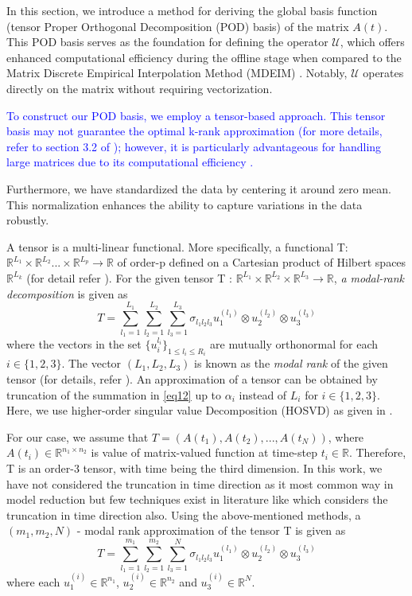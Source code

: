 \documentclass{article}
\begin{document}
In this section, we introduce a method for deriving the global basis function (tensor Proper Orthogonal Decomposition (POD) basis) of the matrix $A(t)$. This POD basis serves as the foundation for defining the operator $\mathcal{U}$, which offers enhanced computational efficiency during the offline stage when compared to the Matrix Discrete Empirical Interpolation Method (MDEIM) \cite{MDEIM}. Notably, $\mathcal{U}$ operates directly on the matrix without requiring vectorization.

\textcolor{blue}{To construct our POD basis, we employ a tensor-based approach. This tensor basis may not guarantee the optimal k-rank approximation (for more details, refer to section 3.2 of \cite{Kolda}); however, it is particularly advantageous for handling large matrices due to its computational efficiency \cite{ZHANG2005224}.}

Furthermore, we have standardized the data by centering it around zero mean. This normalization enhances the ability to capture variations in the data robustly.

 A tensor is a multi-linear functional. More specifically, a functional T: $\mathbb{R}^{L_1}\times \mathbb{R}^{L_2} . . .\times \mathbb{R}^{L_p}\rightarrow \mathbb{R}$ of order-p defined on a Cartesian product of Hilbert spaces $\mathbb{R}^{L_k}$ (for detail refer \cite{deLathauwer,Kolda,SDM}).
 For the given tensor T : $\mathbb{R}^{L_1}\times \mathbb{R}^{L_2} \times \mathbb{R}^{L_3}\rightarrow \mathbb{R}$, \emph{a modal-rank decomposition} is given as
 \begin{equation}\label{eq12} 
T=\sum_{l_1=1}^{L_1}\sum_{l_2=1}^{L_2}\sum_{l_3=1}^{L_3} \sigma_{l_1l_2l_3}u_1^{(l_1)} \otimes u_2^{(l_2)}\otimes  u_3^{(l_3)}
\end{equation}
where the vectors in the set $\{u_i^{l_i}\}_{1\leq l_i \leq R_i}$ are mutually orthonormal for each $i\in \{1,2,3\}$. The vector $(L_1,L_2,L_3)$ is known as the \emph{modal rank} of the given tensor (for details, refer \cite{deLathauwer}). An approximation of a tensor can be obtained by truncation of the summation in \eqref{eq12} up to $\alpha_i$ instead of $L_i$ for $i \in \{1,2,3\}$. Here, we use higher-order singular value Decomposition (HOSVD) as given in \cite{deLathauwer}.

For our case, we assume that $T= (A(t_1), A(t_2), ..., A(t_N))$, where $A(t_i) \in \mathbb{R}^{n_1 \times n_2}$ is value of matrix-valued function at  time-step $t_i\in \mathbb{R}$. Therefore, T is an order-3 tensor, with time being the third dimension.
In this work, we have not considered the truncation in time direction as it most common way in model reduction but few techniques exist in literature like \cite{CHOISpaceTime} which considers the truncation in time direction also. Using the above-mentioned methods, a $(m_1,m_2,N)$ - modal rank approximation of the tensor T is given as
\begin{equation*} 
T=\sum_{l_1=1}^{m_1}\sum_{l_2=1}^{m_2}\sum_{l_3=1}^{N} \sigma_{l_1l_2l_3}u_1^{(l_1)} \otimes u_2^{(l_2)}\otimes  u_3^{(l_3)}
\end{equation*}
where each $u_1^{(i)} \in \mathbb{R}^{n_1}$, $u_2^{(i)} \in \mathbb{R}^{n_2}$ and $u_3^{(i)} \in \mathbb{R}^N$.
\end{document}
